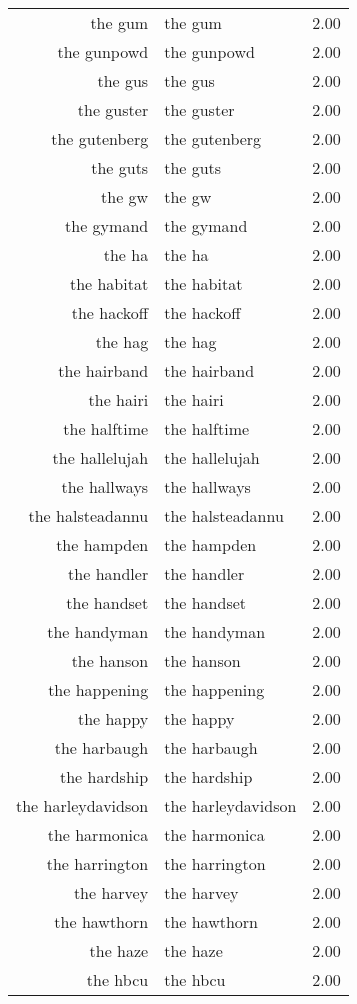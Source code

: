 \begin{table}[ht]
\begin{tabular}{rlr}
  the gum & the gum & 2.00 \\ 
  the gunpowd & the gunpowd & 2.00 \\ 
  the gus & the gus & 2.00 \\ 
  the guster & the guster & 2.00 \\ 
  the gutenberg & the gutenberg & 2.00 \\ 
  the guts & the guts & 2.00 \\ 
  the gw & the gw & 2.00 \\ 
  the gymand & the gymand & 2.00 \\ 
  the ha & the ha & 2.00 \\ 
  the habitat & the habitat & 2.00 \\ 
  the hackoff & the hackoff & 2.00 \\ 
  the hag & the hag & 2.00 \\ 
  the hairband & the hairband & 2.00 \\ 
  the hairi & the hairi & 2.00 \\ 
  the halftime & the halftime & 2.00 \\ 
  the hallelujah & the hallelujah & 2.00 \\ 
  the hallways & the hallways & 2.00 \\ 
  the halsteadannu & the halsteadannu & 2.00 \\ 
  the hampden & the hampden & 2.00 \\ 
  the handler & the handler & 2.00 \\ 
  the handset & the handset & 2.00 \\ 
  the handyman & the handyman & 2.00 \\ 
  the hanson & the hanson & 2.00 \\ 
  the happening & the happening & 2.00 \\ 
  the happy & the happy & 2.00 \\ 
  the harbaugh & the harbaugh & 2.00 \\ 
  the hardship & the hardship & 2.00 \\ 
  the harleydavidson & the harleydavidson & 2.00 \\ 
  the harmonica & the harmonica & 2.00 \\ 
  the harrington & the harrington & 2.00 \\ 
  the harvey & the harvey & 2.00 \\ 
  the hawthorn & the hawthorn & 2.00 \\ 
  the haze & the haze & 2.00 \\ 
  the hbcu & the hbcu & 2.00 \\ 

\end{tabular}
\end{table}
